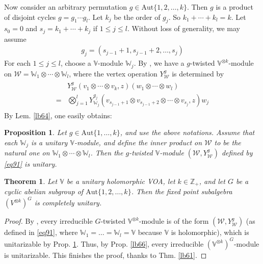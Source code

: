 \documentclass[11pt,b5paper,notitlepage]{article}
\theoremstyle{definition}
\theoremstyle{plain}
\newtheorem{thm}[df]{Theorem}
\newtheorem{pp}[df]{Proposition}
\newcommand{\mc}{\mathcal}
\newcommand{\Vbb}{\mathbb V}
\newcommand{\Wbb}{\mathbb W}
\newcommand{\Zbb}{\mathbb Z}
\newcommand{\Aut}{\mathrm{Aut}}
\numberwithin{equation}{section}
\begin{document}
Now consider an arbitrary permutation $g\in\Aut\{1,2,\dots,k\}$. Then $g$ is a product of disjoint cycles $g=g_1\cdots g_l$. Let $k_j$ be the order of $g_j$. So $k_1+\cdots+k_l=k$. Let $s_0=0$ and $s_j=k_1+\cdots+k_j$ if $1\leq j\leq l$. Without loss of generality, we may assume
\begin{align*}
g_j=(s_{j-1}+1,s_{j-1}+2,\dots,s_j)
\end{align*}
For each $1\leq j\leq l$, choose a $\Vbb$-module $\Wbb_j$. By \cite[Thm. 7.10]{BDM02}, we have a $g$-twisted $\Vbb^{\otimes k}$-module on $\mc W=\Wbb_1\otimes\cdots\otimes\Wbb_l$, where the vertex operation $Y_{\mc W}^g$ is determined by
\begin{align} \label{eq91}
\begin{aligned}
&Y_{\mc W}^g(v_1\otimes\cdots\otimes v_k,z)(w_1\otimes\cdots\otimes w_l)\\
=&\bigotimes_{j=1}^l Y_{\Wbb_j}^{g_j}(v_{s_{j-1}+1}\otimes v_{s_{j-1}+2}\otimes\cdots\otimes v_{s_j},z)w_j
\end{aligned}
\end{align}
By Lem. \ref{lb64}, one easily obtains:

\begin{pp}\label{lb65}
Let $g\in\Aut\{1,\dots,k\}$, and use the above notations. Assume that each $\Wbb_j$ is a unitary $\Vbb$-module, and define the inner product on $\mc W$ to be the natural one on $\Wbb_1\otimes\cdots\otimes\Wbb_l$. Then the $g$-twisted $\Vbb$-module $(\mc W,Y_{\mc W}^g)$ defined by \eqref{eq91} is unitary.
\end{pp}



\begin{thm}
Let $\Vbb$ be a unitary holomorphic VOA, let $k\in\Zbb_+$, and let $G$ be a cyclic abelian subgroup of $\Aut\{1,2,\dots,k\}$. Then the fixed point subalgebra $(V^{\otimes k})^G$ is completely unitary.
\end{thm}


\begin{proof}
By \cite[Thm. 7.10]{BDM02}, every irreducible $G$-twisted $\Vbb^{\otimes k}$-module is of the form $(\mc W,Y_{\mc W}^g)$ (as defined in \eqref{eq91}, where $\Wbb_1=\dots=\Wbb_l=\Vbb$ because $\Vbb$ is holomorphic), which is unitarizable by Prop. \ref{lb65}. Thus, by Prop. \ref{lb66}, every irreducible $(\Vbb^{\otimes k})^G$-module is unitarizable. This finishes the proof, thanks to Thm. \ref{lb61}.
\end{proof}
\end{document}
